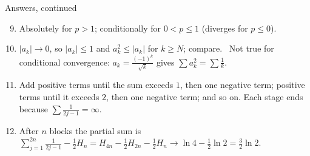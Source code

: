 \documentclass{wosm-slides}
\begin{document}
\begin{frame}{Answers, continued}
  \small
  \begin{enumerate}
    \setcounter{enumi}{8}
    \item Absolutely for $p > 1$; conditionally for $0 < p \le 1$ (diverges for $p \le 0$).
    \item $|a_k| \to 0$, so $|a_k| \le 1$ and $a_k^2 \le |a_k|$ for $k \ge N$; compare. \
      Not true for conditional convergence: $a_k = \frac{(-1)^k}{\sqrt k}$ gives
      $\sum a_k^2 = \sum \frac1k$.
    \item Add positive terms until the sum exceeds $1$, then one negative term; positive
      terms until it exceeds $2$, then one negative term; and so on. Each stage ends because
      $\sum \frac{1}{2j-1} = \infty$.
    \item After $n$ blocks the partial sum is
      $\sum_{j=1}^{2n} \frac{1}{2j-1} - \frac12 H_n = H_{4n} - \frac12 H_{2n} - \frac12 H_n
       \to \ln 4 - \frac12 \ln 2 = \frac32 \ln 2$.
  \end{enumerate}
\end{frame}

\end{document}
